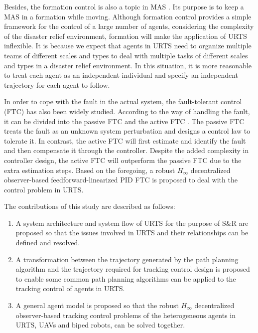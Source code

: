 \documentclass{ieeeaccess}
\begin{document}
Besides, the formation control is also a topic in MAS \cite{wang2022consensus}. Its purpose is to keep a MAS in a formation while moving. Although formation control provides a simple framework for the control of a large number of agents, considering the complexity of the disaster relief environment, formation will make the application of URTS inflexible. It is because we expect that agents in URTS need to organize multiple teams of different scales and types to deal with multiple tasks of different scales and types in a disaster relief environment. In this situation, it is more reasonable to treat each agent as an independent individual and specify an independent trajectory for each agent to follow.

In order to cope with the fault in the actual system, the fault-tolerant control (FTC) has also been widely studied. According to the way of handling the fault, it can be divided into the passive FTC and the active FTC \cite{6669235}. The passive FTC treats the fault as an unknown system perturbation and designs a control law to tolerate it. In contrast, the active FTC will first estimate and identify the fault and then compensate it through the controller. Despite the added complexity in controller design, the active FTC will outperform the passive FTC due to the extra estimation steps. Based on the foregoing, a robust $H_\infty$ decentralized observer-based feedforward-linearized PID FTC is proposed to deal with the control problem in URTS.

The contributions of this study are described as follows:
\begin{enumerate}
    \item A system architecture and system flow of URTS for the purpose of S\&R are proposed so that the issues involved in URTS and their relationships can be defined and resolved.
    \item A transformation between the trajectory generated by the path planning algorithm and the trajectory required for tracking control design is proposed to enable some common path planning algorithms can be applied to the tracking control of agents in URTS.
    \item A general agent model is proposed so that the robust $H_\infty$ decentralized observer-based tracking control problems of the heterogeneous agents in URTS, UAVs and biped robots, can be solved together.
\end{enumerate}
\end{document}

